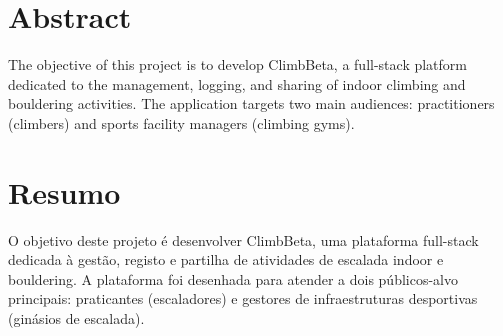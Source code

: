 \documentclass[a4paper,openright,twoside,11pt]{report}
\begin{document}
\cleardoublepage
\chapter*{Abstract}
The objective of this project is to develop ClimbBeta, a full-stack platform dedicated to the management, logging, and sharing of indoor climbing and bouldering activities. The application targets two main audiences: practitioners (climbers) and sports facility managers (climbing gyms).

\cleardoublepage
\chapter*{Resumo}
O objetivo deste projeto é desenvolver ClimbBeta, uma plataforma full-stack dedicada à gestão, registo e partilha de atividades de escalada indoor e bouldering. A plataforma foi desenhada para atender a dois públicos-alvo principais: praticantes (escaladores) e gestores de infraestruturas desportivas (ginásios de escalada).



\cleardoublepage
\tableofcontents \cleardoublepage


\setcounter{page}{1}


















\end{document}
